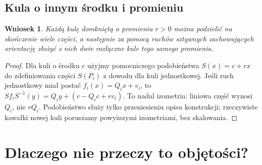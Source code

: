 \documentclass[11pt,a4paper]{article}
\numberwithin{equation}{section}
\theoremstyle{plain}
\newtheorem{wniosek}[twierdzenie]{Wniosek}
\theoremstyle{definition}
\theoremstyle{remark}
\begin{document}
\subsection{Kula o innym środku i promieniu}
\begin{wniosek}\label{wn:dowolna-kula}
Każdą kulę domkniętą o promieniu $r>0$ można podzielić na skończenie wiele części, a następnie za pomocą ruchów sztywnych zachowujących orientację złożyć z nich dwie rozłączne kule tego samego promienia.
\end{wniosek}
\begin{proof}
Dla kuli o środku $c$ użyjmy pomocniczego podobieństwa $S(x)=c+rx$ do zdefiniowania części $S(P_i)$ z dowodu dla kuli jednostkowej. Jeśli ruch jednostkowy miał postać $f_i(x)=Q_ix+v_i$, to $Sf_iS^{-1}(y)=Q_iy+(c-Q_ic+rv_i)$. To nadal izometria: liniowa część wynosi $Q_i$, nie $rQ_i$. Podobieństwo służy tylko przeniesieniu opisu konstrukcji; rzeczywiste kawałki nowej kuli poruszamy powyższymi izometriami, bez skalowania.
\end{proof}

\section{Dlaczego nie przeczy to objętości?}
\end{document}
